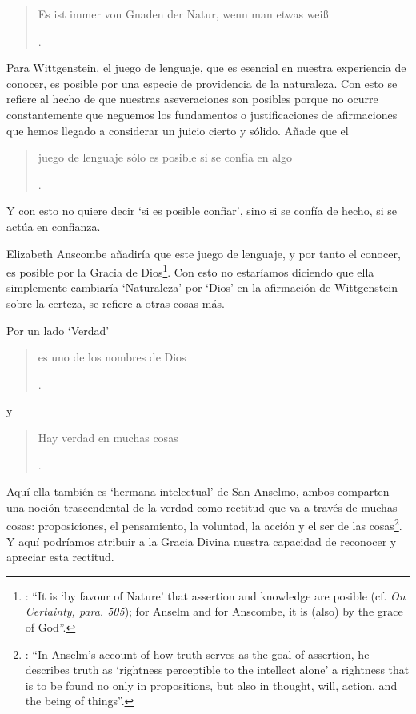 \label{subsec:providencia}
\blockquote[{\Cite[\S505]{wittgenstein1969oncertes}}.]{Es ist immer von Gnaden der Natur, wenn man etwas weiß}. Para Wittgenstein, el juego de lenguaje, que es esencial en nuestra experiencia de conocer, es posible por una especie de providencia de la naturaleza. Con esto se refiere al hecho de que nuestras aseveraciones son posibles porque no ocurre constantemente que neguemos los fundamentos o justificaciones de afirmaciones que hemos llegado a considerar un juicio cierto y sólido. Añade que el \blockquote[{\Cite[\S509]{wittgenstein1969oncertes}}.]{juego de lenguaje sólo es posible si se confía en algo}. Y con esto no quiere decir \enquote*{si es posible confiar}, sino si se confía de hecho, si se actúa en confianza.

Elizabeth Anscombe añadiría que este juego de lenguaje, y por tanto el conocer, es posible por la Gracia de Dios\footnote{\Cite[Cf.][224]{teichmann2008ans}: \enquote{It is `by favour of Nature' that assertion and knowledge are posible (cf. \emph{On Certainty, para. 505}); for Anselm and for Anscombe, it is (also) by the grace of God}.}. Con esto no estaríamos diciendo que ella simplemente cambiaría `Naturaleza' por `Dios' en la afirmación de Wittgenstein sobre la certeza, se refiere a otras cosas más.

Por un lado `Verdad' \blockquote[{\Cite[47]{torralbaynubiola2005fayeh:verdad}}.]{es uno de los nombres de Dios} y \blockquote[{\Cite[47]{torralbaynubiola2005fayeh:verdad}}.]{Hay verdad en muchas cosas}. Aquí ella también es `hermana intelectual' de San Anselmo, ambos comparten una noción trascendental de la verdad como rectitud que va a través de muchas cosas: proposiciones, el pensamiento, la voluntad, la acción y el ser de las cosas\footnote{\Cite[Cf.][197]{teichmann2008ans}: \enquote{In Anselm's account of how truth serves as the goal of assertion, he describes truth as `rightness perceptible to the intellect alone' \textelp{} a rightness that is to be found no only in propositions, but also in thought, will, action, and the being of things}.}. Y aquí podríamos atribuir a la Gracia Divina nuestra capacidad de reconocer y apreciar esta rectitud.

